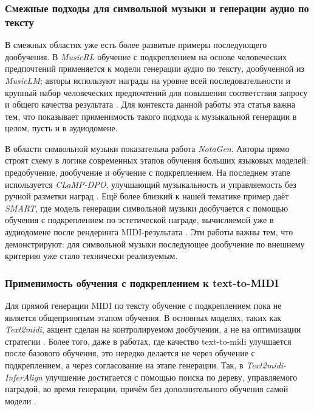 \documentclass[a4paper,12pt]{extarticle}
\begin{document}
\subsubsection{Смежные подходы для символьной музыки и генерации аудио по тексту}

В смежных областях уже есть более развитые примеры последующего
дообучения. В \textit{MusicRL} обучение с подкреплением на основе
человеческих предпочтений применяется к модели генерации аудио по тексту,
дообученной из \textit{MusicLM}; авторы используют награды на уровне всей
последовательности и крупный набор человеческих предпочтений для повышения
соответствия запросу и общего качества результата \cite{musicrl2024}. Для
контекста данной работы эта статья важна тем, что показывает применимость
такого подхода к музыкальной генерации в целом, пусть и в аудиодомене.

В области символьной музыки показательна работа \textit{NotaGen}. Авторы
прямо строят схему в логике современных этапов обучения больших языковых
моделей: предобучение, дообучение и обучение с подкреплением. На
последнем этапе используется \textit{CLaMP-DPO}, улучшающий музыкальность
и управляемость без ручной разметки наград \cite{notagen2025}. Ещё более
близкий к нашей тематике пример даёт \textit{SMART}, где модель генерации
символьной музыки дообучается с помощью обучения с подкреплением по
эстетической награде, вычисляемой уже в аудиодомене после рендеринга
MIDI-результата \cite{smart2025}. Эти работы важны тем, что
демонстрируют: для символьной музыки последующее дообучение по внешнему
критерию уже стало технически реализуемым.

\subsubsection{Применимость обучения с подкреплением к text-to-MIDI}

Для прямой генерации MIDI по тексту обучение с подкреплением пока не
является общепринятым этапом обучения. В основных моделях, таких как
\textit{Text2midi}, акцент сделан на контролируемом дообучении, а не на
оптимизации стратегии \cite{text2midi2025}. Более того, даже в работах,
где качество text-to-midi улучшается после базового обучения, это нередко
делается не через обучение с подкреплением, а через согласование на этапе
генерации. Так, в \textit{Text2midi-InferAlign} улучшение достигается с
помощью поиска по дереву, управляемого наградой, во время генерации,
причём без дополнительного обучения самой модели
\cite{text2midiinferalign2025}.
\end{document}
